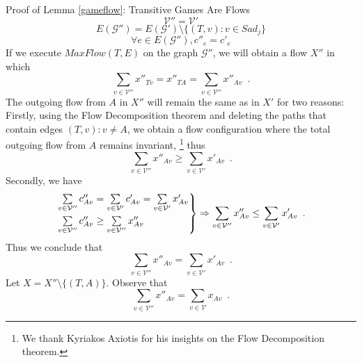 \begin{sepproof}{Proof of Lemma \ref{gameflow}: Transitive Games Are Flows}
\begin{equation*}
      \mathcal{V}'' = \mathcal{V}'
   \end{equation*}
   \begin{equation*}
      E(\mathcal{G}'') = E(\mathcal{G}') \setminus \{(T, v) : v \in Sad_j\}
   \end{equation*}
   \begin{equation*}
      \forall e \in E(\mathcal{G}''), c''_e = c'_e
   \end{equation*}
   If we execute $MaxFlow(T, E)$ on the graph $\mathcal{G}''$, we will obtain a flow $X''$ in which
   \begin{equation*}
      \sum\limits_{v \in \mathcal{V}''}x''_{Tv} = x''_{TA} = \sum\limits_{v \in \mathcal{V}''}x''_{Av} \enspace.
   \end{equation*}
   The outgoing flow from $A$ in $X''$ will remain the same as in $X'$ for two reasons: Firstly, using the Flow
   Decomposition theorem \cite{amo} and deleting the paths that contain edges $\left(T, v\right): v \neq A$, we
   obtain a flow configuration where the total outgoing flow from $A$ remains invariant,
       \footnote{We thank Kyriakos Axiotis for his insights on the Flow Decomposition theorem.}
   thus
   \begin{equation*}
      \sum\limits_{v \in \mathcal{V}''}x''_{Av} \geq \sum\limits_{v \in \mathcal{V}'}x'_{Av} \enspace.
   \end{equation*}
   Secondly, we have
   \begin{equation*}
      \begin{rcases}
         \sum\limits_{v \in \mathcal{V}''}c''_{Av} = \sum\limits_{v \in \mathcal{V}'}c'_{Av} = \sum\limits_{v \in
         \mathcal{V}'}x'_{Av} \\
         \sum\limits_{v \in \mathcal{V}''}c''_{Av} \geq \sum\limits_{v \in \mathcal{V}''}x''_{Av}
      \end{rcases}
      \Rightarrow \sum\limits_{v \in \mathcal{V}''}x''_{Av} \leq \sum\limits_{v \in \mathcal{V}'}x'_{Av} \enspace.
   \end{equation*}
   Thus we conclude that
   \begin{equation}
   \label{primeequaldoubleprime}
      \sum\limits_{v \in \mathcal{V}''}x''_{Av} = \sum\limits_{v \in \mathcal{V}'}x'_{Av} \enspace.
   \end{equation}
   Let $X = X'' \setminus \{(T, A)\}$. Observe that
   \begin{equation*}
      \sum\limits_{v \in \mathcal{V}''}x''_{Av} = \sum\limits_{v \in \mathcal{V}}x_{Av} \enspace.
   \end{equation*}

\end{sepproof}
